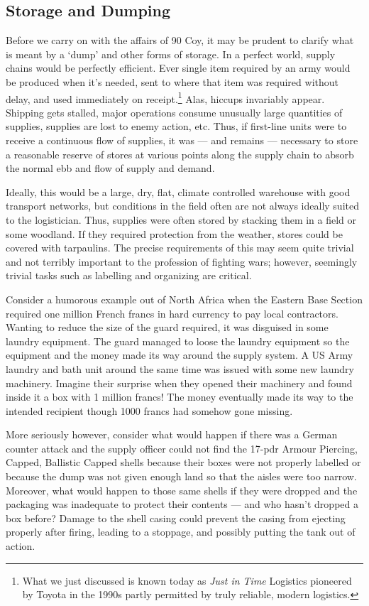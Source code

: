 \documentclass[noraggedright]{turabian-researchpaper}
\begin{document}
\subsection{Storage and Dumping}
Before we carry on with the affairs of 90 Coy, it may be prudent to 
clarify what is meant by a `dump' and other forms of storage.  In a perfect 
world, supply chains would be perfectly efficient.  Ever single item required
by an army would be produced when it's needed, sent to where that item was 
required without delay, and used immediately on receipt.\footnote{
	What we just discussed is known today as \textit{Just in Time} 
	Logistics pioneered by Toyota in the 1990s partly permitted by truly
	reliable, modern logistics. %
}
Alas, hiccups 
invariably appear.  Shipping gets stalled, major operations consume unusually
large quantities of supplies, supplies are lost to enemy action, etc.  Thus,
if first-line units were to receive a continuous flow of supplies, it was ---
and remains --- necessary to store a reasonable reserve of stores at various
points along the supply chain to absorb the normal ebb and flow of supply and
demand.  

Ideally, this would be a large, dry, flat, climate controlled warehouse with 
good transport networks, but conditions in the field often are not always 
ideally suited to the logistician.  Thus, supplies were often stored by 
stacking them in a field or some woodland. If they required protection 
from the weather, stores could be covered with tarpaulins. %
The precise requirements of this may seem quite
trivial and not terribly important to the profession of fighting wars; however,
seemingly trivial tasks such as labelling and organizing are critical.  

Consider a humorous example out of North Africa when the Eastern Base Section
required one million French francs in hard currency to pay local contractors.
Wanting to reduce the size of the guard required, it was disguised in some
laundry equipment. The guard managed to loose the laundry equipment so the
equipment and the money made its way around the supply system.  A US Army
laundry and bath unit around the same time was issued with some new laundry
machinery.  Imagine their surprise when they opened their machinery and found
inside it a box with 1 million francs!  The money eventually made its way to
the intended recipient though 1000 francs had somehow gone missing.\autocite
[50]{wos} 

More seriously however, consider what would happen if there was a German 
counter attack and the supply officer could not find the 17-pdr Armour 
Piercing, Capped, Ballistic Capped shells because their boxes were not 
properly labelled or because the dump was not given enough land so that the 
aisles were too narrow.  Moreover, what would happen to those same 
shells if they were dropped and the packaging was inadequate to protect their 
contents --- and who hasn't dropped a box before?  Damage to 
the shell casing could prevent the casing from ejecting properly after 
firing, leading to a stoppage, and possibly putting the tank out of action.  
\end{document}
